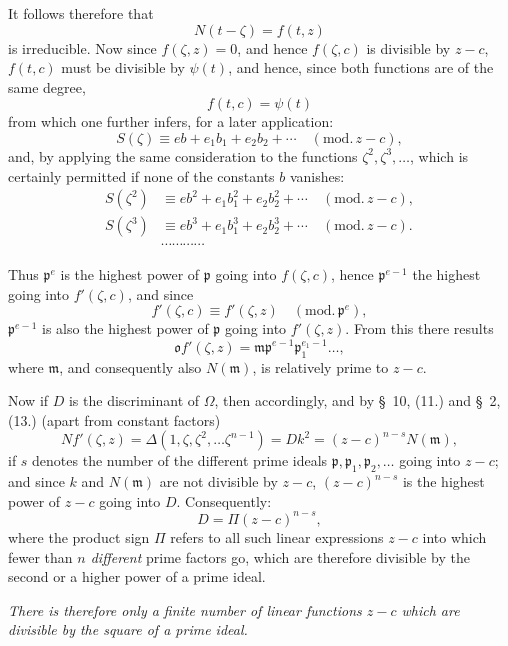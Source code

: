 \documentclass{article}
\begin{document}

It follows therefore that
\[ N(t-\zeta) = f(t, z) \]
is irreducible. Now since $f(\zeta, z) = 0$, and hence $f(\zeta, c)$ is divisible by $z-c$, $f(t, c)$ must be divisible by $\psi(t)$, and hence, since both functions are of the same degree,
\[ f(t, c) = \psi(t) \]
from which one further infers, for a later application:
\[ S(\zeta) \equiv eb + e_{1}b_{1} + e_{2}b_{2} + \cdots \quad (\text{mod.}\,z-c), \]
and, by applying the same consideration to the functions $\zeta^{2}, \zeta^{3}, \ldots$, which is certainly permitted if none of the constants $b$ vanishes:
\[ \begin{aligned} S(\zeta^{2}) &\equiv eb^{2} + e_{1}b_{1}^{2} + e_{2}b_{2}^{2} + \cdots \quad (\text{mod.}\,z-c), \\ S(\zeta^{3}) &\equiv eb^{3} + e_{1}b_{1}^{3} + e_{2}b_{2}^{3} + \cdots \quad (\text{mod.}\,z-c). \\ &\cdots\cdots\cdots\cdots \end{aligned} \]

Thus $\mathfrak{p}^{e}$ is the highest power of $\mathfrak{p}$ going into $f(\zeta, c)$, hence $\mathfrak{p}^{e-1}$ the highest going into $f'(\zeta, c)$, and since
\[ f'(\zeta, c) \equiv f'(\zeta, z) \quad (\text{mod.}\,\mathfrak{p}^{e}), \]
$\mathfrak{p}^{e-1}$ is also the highest power of $\mathfrak{p}$ going into $f'(\zeta, z)$. From this there results
\[ \mathfrak{o}f'(\zeta, z) = \mathfrak{m}\mathfrak{p}^{e-1}\mathfrak{p}_{1}^{e_{1}-1}\ldots, \]
where $\mathfrak{m}$, and consequently also $N(\mathfrak{m})$, is relatively prime to $z-c$.

Now if $D$ is the discriminant of $\Omega$, then accordingly, and by §~10, (11.) and §~2, (13.) (apart from constant factors)
\[ Nf'(\zeta, z) = \Delta(1, \zeta, \zeta^{2}, \ldots \zeta^{n-1}) = Dk^{2} = (z-c)^{n-s}N(\mathfrak{m}), \]
if $s$ denotes the number of the different prime ideals $\mathfrak{p}, \mathfrak{p}_{1}, \mathfrak{p}_{2}, \ldots$ going into $z-c$; and since $k$ and $N(\mathfrak{m})$ are not divisible by $z-c$, $(z-c)^{n-s}$ is the highest power of $z-c$ going into $D$. Consequently:
\[ D = \Pi(z-c)^{n-s}, \tag{1.} \]
where the product sign $\Pi$ refers to all such linear expressions $z-c$ into which fewer than \emph{$n$ different} prime factors go, which are therefore divisible by the second or a higher power of a prime ideal.

\emph{There is therefore only a finite number of linear functions $z-c$ which are divisible by the square of a prime ideal.}
\end{document}
